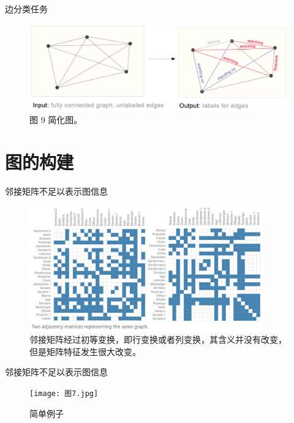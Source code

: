 \documentclass{beamer}
\begin{document}
\begin{frame}{边分类任务}
    \begin{figure}
        \includegraphics[width=\textwidth]{边分类2.jpg}
        \caption{图 9 简化图。}
    \end{figure}
\end{frame}

\section{图的构建}

\begin{frame}{邻接矩阵不足以表示图信息}
    \begin{figure}
        \includegraphics[width=0.9\textwidth]{邻接矩阵.jpg}
        \caption{邻接矩阵经过初等变换，即行变换或者列变换，其含义并没有改变，但是矩阵特征发生很大改变。}
    \end{figure}
\end{frame}

\begin{frame}{邻接矩阵不足以表示图信息}
    \begin{figure}
        \texttt{[image: 图7.jpg]}
        \caption{简单例子}
    \end{figure}
\end{frame}
\end{document}
